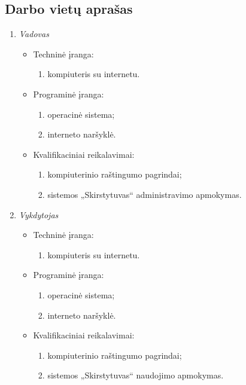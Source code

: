 \subsection{Darbo vietų aprašas}
\begin{enumerate}
  \item \emph{Vadovas}
	\begin{itemize}
	  \item Techninė įranga:
		\begin{enumerate}
			\item kompiuteris su internetu.
		\end{enumerate}
	  \item Programinė įranga:
		\begin{enumerate}
			\item operacinė sistema;
      \item interneto naršyklė.
		\end{enumerate}
	  \item Kvalifikaciniai reikalavimai:
		\begin{enumerate}
			\item kompiuterinio raštingumo pagrindai;
			\item sistemos „Skirstytuvas“ administravimo apmokymas.
		\end{enumerate}
	\end{itemize}

  \item \emph{Vykdytojas}
	\begin{itemize}
	  \item Techninė įranga:
		\begin{enumerate}
			\item kompiuteris su internetu.
		\end{enumerate}
	  \item Programinė įranga:
		\begin{enumerate}
			\item operacinė sistema;
      \item interneto naršyklė.
		\end{enumerate}
	  \item Kvalifikaciniai reikalavimai:
		\begin{enumerate}
			\item kompiuterinio raštingumo pagrindai;
			\item sistemos „Skirstytuvas“ naudojimo apmokymas.
		\end{enumerate}
	\end{itemize}
\end{enumerate}

